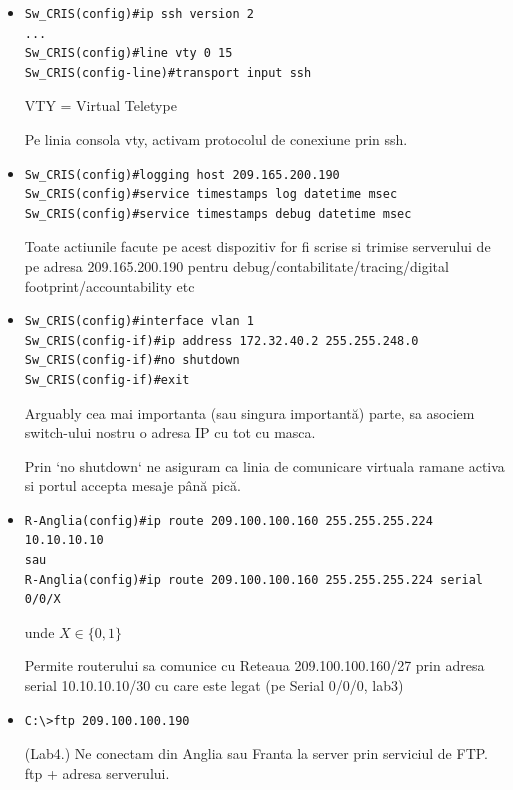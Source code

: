 \documentclass{article}
\begin{document}
\begin{itemize}
\url{https://en.wikipedia.org/wiki/RSA_cryptosystem}.




\item 
\begin{verbatim}
Sw_CRIS(config)#ip ssh version 2
...
Sw_CRIS(config)#line vty 0 15
Sw_CRIS(config-line)#transport input ssh
\end{verbatim}

VTY = Virtual Teletype

Pe linia consola vty, activam protocolul de conexiune prin ssh.


\item 
\begin{verbatim}
Sw_CRIS(config)#logging host 209.165.200.190
Sw_CRIS(config)#service timestamps log datetime msec
Sw_CRIS(config)#service timestamps debug datetime msec
\end{verbatim}
Toate actiunile facute pe acest dispozitiv for fi scrise si trimise serverului de pe adresa 209.165.200.190 pentru debug/contabilitate/tracing/digital footprint/accountability etc


\item 
\begin{verbatim}
Sw_CRIS(config)#interface vlan 1
Sw_CRIS(config-if)#ip address 172.32.40.2 255.255.248.0
Sw_CRIS(config-if)#no shutdown
Sw_CRIS(config-if)#exit
\end{verbatim}

Arguably cea mai importanta (sau singura importantă) parte, sa asociem switch-ului nostru o adresa IP cu tot cu masca.

Prin `no shutdown` ne asiguram ca linia de comunicare virtuala ramane activa si portul accepta mesaje până pică.


\item 
\begin{verbatim}
R-Anglia(config)#ip route 209.100.100.160 255.255.255.224 10.10.10.10
sau 
R-Anglia(config)#ip route 209.100.100.160 255.255.255.224 serial 0/0/X
\end{verbatim}
unde $X\in\{0,1\}$

Permite routerului sa comunice cu Reteaua 209.100.100.160/27 prin adresa serial 10.10.10.10/30 cu care este legat (pe Serial 0/0/0, lab3)

\item 
\begin{verbatim}
C:\>ftp 209.100.100.190
\end{verbatim}

(Lab4.) Ne conectam din Anglia sau Franta la server prin serviciul de FTP. ftp + adresa serverului.



\end{itemize}
\newpage
\end{document}

